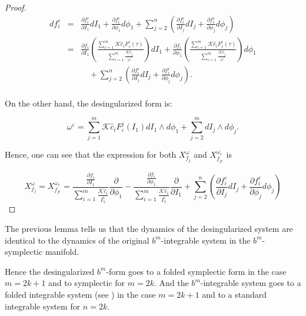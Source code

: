 \begin{proof}
$$
\begin{array}{rcl}
d f_i^\varepsilon & = & \frac{\partial f_i^\varepsilon}{\partial I_1} dI_1 + \frac{\partial f_i^\varepsilon}{\partial \phi_1} d\phi_1 + \sum_{j= 2}^n\left(\frac{\partial f_i^\varepsilon}{\partial I_j} dI_j + \frac{\partial f_i^\varepsilon}{\partial \phi_j} d\phi_j\right)\\
 & = & \frac{\partial f_i}{\partial I_1}\left(\frac{\sum_{i=1}^m \mathcal{K} \hat c_i F_\varepsilon^i(\tau)}{\sum_{i=1}^m \frac{\mathcal{K} \hat c_j}{\tau^j}}\right) dI_1 + \frac{\partial f_i}{\partial \phi_1}\left(\frac{\sum_{i=1}^m \mathcal{K} \hat c_i F_\varepsilon^i(\tau)}{\sum_{i=1}^m \frac{\mathcal{K} \hat c_j}{\tau^j}}\right) d\phi_1 \\
 & & \quad + \sum_{j= 2}^n\left(\frac{\partial f_i^\varepsilon}{\partial I_j} dI_j + \frac{\partial f_i^\varepsilon}{\partial \phi_j} d\phi_j\right).\\
\end{array}
$$

On the other hand, the desingularized form is:

$$\omega^\varepsilon = \sum_{j=1}^m \mathcal{K} \hat c_i F_\varepsilon^j (I_1) d I_1 \wedge d\phi_1 + \sum_{j=2}^m dI_j \wedge d\phi_j.$$

Hence, one can see that the expression for both $X_{f_j}^\omega$ and $X_{f_{j\epsilon}}^{\omega_\epsilon}$ is

$$X_{f_j}^\omega = X_{f_{j\epsilon}}^{\omega_\epsilon} = \frac{\frac{\partial f_i}{\partial I_1}}{\sum_{i=1}^m\frac{\mathcal{K}\hat c_i}{I_1^i}}\frac{\partial}{\partial \phi_1} - \frac{\frac{\partial f_i}{\partial \phi_1}}{\sum_{i=1}^m\frac{\mathcal{K}\hat c_i}{I_1^i}}\frac{\partial}{\partial I_1} +\sum_{j= 2}^n\left(\frac{\partial f_i^\varepsilon}{\partial I_j} dI_j + \frac{\partial f_i^\varepsilon}{\partial \phi_j} d\phi_j\right)$$

\end{proof}

\begin{remark}
The previous lemma tells us that the dynamics of the desingularized system are identical to the dynamics of the original $b^m$-integrable system in the $b^m$-symplectic manifold.
\end{remark}

Hence the desingularized $b^m$-form goes to a folded symplectic form in the case $m=2k+1$ and to symplectic for $m=2k$. And the $b^m$-integrable system goes to a folded integrable system (see \cite{EvaRobert}) in the case $m=2k+1$ and to a standard integrable system for $n=2k$.

